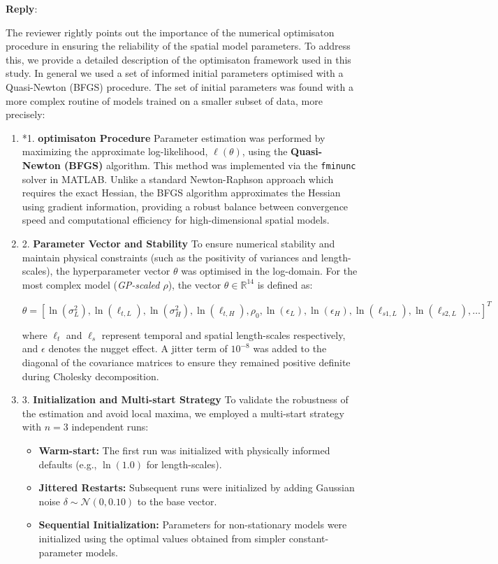 \documentclass[12pt]{article}
\newcommand{\0}{\mathbf{0}}
\newcounter{reviewer}
\newcounter{point}[reviewer]
\newenvironment{reply}
   {\medskip \noindent \begin{sf}\color{Blue}\textbf{Reply}:\  }
   {\medskip \end{sf}}
\begin{document}
\begin{reply}

The reviewer rightly points out the importance of the numerical optimisaton procedure in ensuring the reliability of the spatial model parameters. To address this, we provide a detailed description of the optimisaton framework used in this study.
In general we used a set of informed initial parameters optimised with a Quasi-Newton (BFGS) procedure.  The set of initial parameters was found with a more complex routine of models trained on a smaller subset of data, more precisely:

\begin{enumerate}
\item*{1. \textbf{optimisaton Procedure}}
Parameter estimation was performed by maximizing the approximate log-likelihood, $\ell(\theta)$, using the \textbf{Quasi-Newton (BFGS)} algorithm. This method was implemented via the \texttt{fminunc} solver in MATLAB. Unlike a standard Newton-Raphson approach which requires the exact Hessian, the BFGS algorithm approximates the Hessian using gradient information, providing a robust balance between convergence speed and computational efficiency for high-dimensional spatial models.

\item{2. \textbf{Parameter Vector and Stability}}
To ensure numerical stability and maintain physical constraints (such as the positivity of variances and length-scales), the hyperparameter vector $\theta$ was optimised in the log-domain. For the most complex model (\textit{GP-scaled $\rho$}), the vector $\theta \in \mathbb{R}^{14}$ is defined as:

\begin{equation}
\theta = [ \ln(\sigma^2_L), \ln(\ell_{t,L}), \ln(\sigma^2_H), \ln(\ell_{t,H}), \rho_0, \ln(\epsilon_L), \ln(\epsilon_H), \ln(\ell_{s1,L}), \ln(\ell_{s2,L}), \dots ]^T
\end{equation}

where $\ell_t$ and $\ell_s$ represent temporal and spatial length-scales respectively, and $\epsilon$ denotes the nugget effect. A jitter term of $10^{-8}$ was added to the diagonal of the covariance matrices to ensure they remained positive definite during Cholesky decomposition.

\item {3. \textbf{Initialization and Multi-start Strategy}}
To validate the robustness of the estimation and avoid local maxima, we employed a multi-start strategy with $n=3$ independent runs:
\begin{itemize}
    \item \textbf{Warm-start:} The first run was initialized with physically informed defaults (e.g., $\ln(1.0)$ for length-scales).
    \item \textbf{Jittered Restarts:} Subsequent runs were initialized by adding Gaussian noise $\delta \sim \mathcal{N}(0, 0.10)$ to the base vector.
    \item \textbf{Sequential Initialization:} Parameters for non-stationary models were initialized using the optimal values obtained from simpler constant-parameter models.
\end{itemize}


\end{enumerate}
\end{reply}
\end{document}
